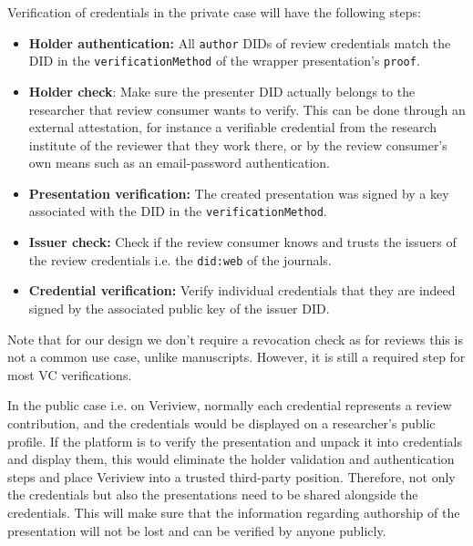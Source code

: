 Verification of credentials in the private case will have the following steps:
\begin{itemize}
    \item \textbf{Holder authentication:} All \lstinline{author} \acrshort{DID}s of review credentials match the \acrshort{DID} in the \lstinline{verificationMethod} of the wrapper presentation's \lstinline{proof}.
    
    \item \textbf{Holder check}: Make sure the presenter \acrshort{DID} actually belongs to the researcher that review consumer wants to verify. This can be done through an external attestation, for instance a verifiable credential from the research institute of the reviewer that they work there, or by the review consumer's own means such as an email-password authentication. 
    
    \item \textbf{Presentation verification:} The created presentation was signed by a key associated with the \acrshort{DID} in the \lstinline{verificationMethod}.
    
    \item \textbf{Issuer check:} Check if the review consumer knows and trusts the issuers of the review credentials i.e. the \lstinline{did:web} of the journals.
    
    \item \textbf{Credential verification:} Verify individual credentials that they are indeed signed by the associated public key of the issuer \acrshort{DID}.
\end{itemize}

Note that for our design we don't require a revocation check as for reviews this is not a common use case, unlike manuscripts. However, it is still a required step for most \acrshort{VC} verifications.

In the public case i.e. on Veriview, normally each credential represents a review contribution, and the credentials would be displayed on a researcher's public profile. If the platform is to verify the presentation and unpack it into credentials and display them, this would eliminate the holder validation and authentication steps and place Veriview into a trusted third-party position. Therefore, not only the credentials but also the presentations need to be shared alongside the credentials. This will make sure that the information regarding authorship of the presentation will not be lost and can be verified by anyone publicly. 

